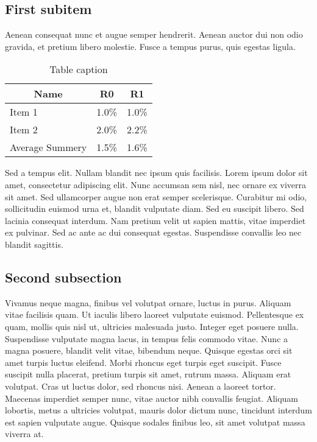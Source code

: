 \documentclass[10pt,a4paper,twoside,twocolumn]{article}
\begin{document}
\subsection{First subitem}

Aenean consequat nunc et augue semper hendrerit. Aenean auctor dui non odio gravida, et pretium libero molestie. Fusce a tempus purus, quis egestas ligula.

\begin{table}[ht]
\centering
\begin{tabular}{@{}lcc@{}}
\toprule
\multicolumn{1}{c}{\textbf{Name}} & \textbf{R0} & \textbf{R1} \\ \midrule
\multicolumn{1}{|l|}{Item 1} & \multicolumn{1}{c|}{1.0\%} & \multicolumn{1}{c|}{1.0\%} \\ \midrule
\multicolumn{1}{|l|}{Item 2} & \multicolumn{1}{c|}{2.0\%} & \multicolumn{1}{c|}{2.2\%} \\ \midrule
\multicolumn{1}{r}{Average Summery} & \multicolumn{1}{l}{1.5\%} & \multicolumn{1}{l}{1.6\%} \\ \bottomrule
\end{tabular}
\caption{Table caption}
\label{tab:table-ref}
\end{table}

Sed a tempus elit. Nullam blandit nec ipsum quis facilisis. Lorem ipsum dolor sit amet, consectetur adipiscing elit. Nunc accumsan sem nisl, nec ornare ex viverra sit amet. Sed ullamcorper augue non erat semper scelerisque. Curabitur mi odio, sollicitudin euismod urna et, blandit vulputate diam. Sed eu suscipit libero. Sed lacinia consequat interdum. Nam pretium velit ut sapien mattis, vitae imperdiet ex pulvinar. Sed ac ante ac dui consequat egestas. Suspendisse convallis leo nec blandit sagittis.

\subsection{Second subsection}

Vivamus neque magna, finibus vel volutpat ornare, luctus in purus. Aliquam vitae facilisis quam. Ut iaculis libero laoreet vulputate euismod. Pellentesque ex quam, mollis quis nisl ut, ultricies malesuada justo. Integer eget posuere nulla. Suspendisse vulputate magna lacus, in tempus felis commodo vitae. Nunc a magna posuere, blandit velit vitae, bibendum neque. Quisque egestas orci sit amet turpis luctus eleifend. Morbi rhoncus eget turpis eget suscipit. Fusce suscipit nulla placerat, pretium turpis sit amet, rutrum massa. Aliquam erat volutpat. Cras ut luctus dolor, sed rhoncus nisi. Aenean a laoreet tortor. Maecenas imperdiet semper nunc, vitae auctor nibh convallis feugiat. Aliquam lobortis, metus a ultricies volutpat, mauris dolor dictum nunc, tincidunt interdum est sapien vulputate augue. Quisque sodales finibus leo, sit amet volutpat massa viverra at.
\end{document}

